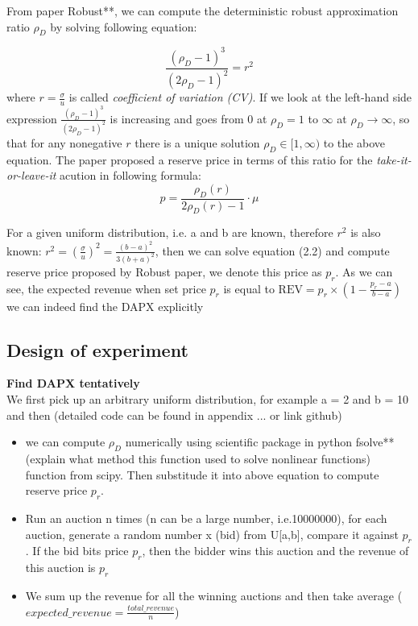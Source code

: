 From paper Robust**, we can compute the deterministic robust approximation ratio $\rho_{D}$ by solving following equation:

\begin{equation}\label{eq:2.2}
\frac {(\rho_{D}-1)^{3}}{(2\rho_{D}-1)^{2}} = r^{2}
\end{equation} 
where $r = \frac{\sigma}{u}$ is called \textit{coefficient of variation (CV)}. If we look at the left-hand side expression $\frac {(\rho_{D}-1)^{3}}{(2\rho_{D}-1)^{2}}$ is increasing and goes from 0 at $\rho_{D} = 1$ to $\infty$ at $\rho_{D} \rightarrow \infty$, so that for any nonegative $r$ there is a unique solution $\rho_{D} \in [1,\infty)$ to the above equation. The paper proposed a reserve price in terms of this ratio for the \textit{take-it-or-leave-it} acution in following formula:
\begin{equation}\label{eq:2.3}
 p = \frac{\rho_{D}(r)}{2\rho_{D}(r)-1}\cdot \mu
\end{equation} 


For a given uniform distribution, i.e. a and b are known, therefore $r^{2}$ is also known: $r^{2} = (\frac{\sigma}{u})^{2} = \frac{(b-a)^{2}}{3(b+a)^{2}}$, then we can solve equation (2.2) and compute reserve price proposed by Robust paper, we denote this price as $p_r$. As we can see, the expected revenue when set price $p_r$ is equal to $\text{REV} = p_r\times (1-\frac {p_r-a}{b-a})$ we can indeed find the DAPX explicitly 

\subsection{Design of experiment}
\textbf{Find DAPX tentatively}\\
We first pick up an arbitrary uniform distribution, for example a = 2 and b = 10 and then (detailed code can be found in appendix ... or link github)
\begin{itemize}
	\item we can compute $\rho_{D}$ numerically using scientific package in python fsolve**(explain what method this function used to solve nonlinear functions) function from scipy. Then substitude it into above equation to compute reserve price $p_r$.
	\item Run an auction n times (n can be a large number, i.e.10000000), for each auction, generate a random number x (bid) from U[a,b], compare it against $p_r$. If the bid bits price $p_r$, then the bidder wins this auction and the revenue of this auction is $p_r$ 
	\item We sum up the revenue for all the winning auctions and then take average ($expected\_revenue = \frac{total\_revenue}{n}$)
\end{itemize}

